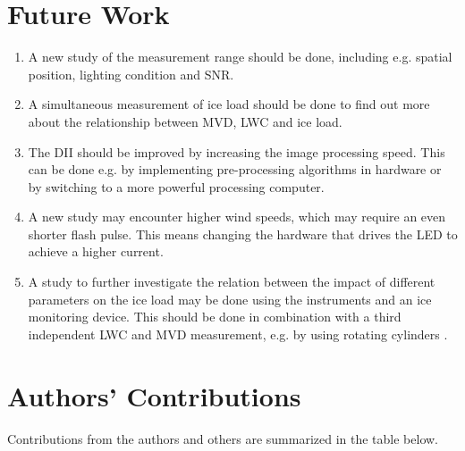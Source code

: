 \section{Future Work}

\begin{enumerate}
\item
A new study of the measurement range should be done, including e.g. spatial position, lighting condition and SNR.

\item
A simultaneous measurement of ice load should be done to find out more about the relationship between MVD, LWC and ice load.

\item
The DII should be improved by increasing the image processing speed. This can be done e.g. by implementing pre-processing algorithms in hardware or by switching to a more powerful processing computer.

\item
A new study may encounter higher wind speeds, which may require an even shorter flash pulse. This means changing the hardware that drives the LED to achieve a higher current.

\item
A study to further investigate the relation between the impact of different parameters on the ice load may be done using the instruments and an ice monitoring device. This should be done in combination with a third independent LWC and MVD measurement, e.g. by using rotating cylinders \cite{makk1992}.

\end{enumerate}

\section{Authors' Contributions}

Contributions from the authors and others are summarized in the table below.

